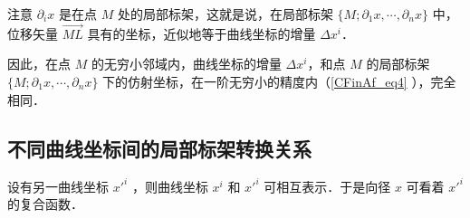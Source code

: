 注意 $\partial_i x$ 是在点 $M$ 处的局部标架，这就是说，在局部标架 $\{M;\partial_1 x,\cdots,\partial_n x\}$ 中，位移矢量 $\overrightarrow{ML}$ 具有的坐标，近似地等于曲线坐标的增量 $\Delta x^i$．

因此，在点 $M$ 的无穷小邻域内，曲线坐标的增量 $\Delta x^i$，和点 $M$ 的局部标架 $\{M;\partial_1 x,\cdots,\partial_n x\}$ 下的仿射坐标，在一阶无穷小的精度内（\autoref{CFinAf_eq4} ），完全相同．

\subsection{不同曲线坐标间的局部标架转换关系}

设有另一曲线坐标 $x'^i$ ，则曲线坐标 $x^i$ 和 $x'^i$ 可相互表示．于是向径 $x$ 可看着 $x'^i$ 的复合函数． 
